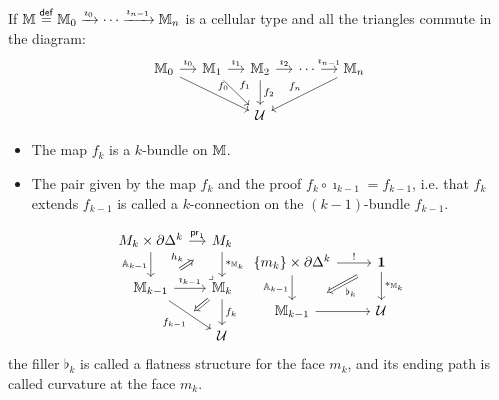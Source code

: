 \documentclass[14pt,aspectratio=169]{beamer}
\renewcommand{\mathrm}[1]{\mathsf{#1}}
\renewcommand{\defemph}[1]{\alert{#1}}
\begin{document}
\begin{frame}
\begin{definition}
If \( \mm\defeq \mm_0\xrightarrow[]{\imath_0}\cdots\xrightarrow[]{\imath_{n-1}}\mm_n \) is a cellular type and all the triangles commute in the diagram:\vspace{-10pt}
\[\begin{tikzcd}[ampersand replacement=\&, column sep=small]
  {\mm_0} \& {\mm_1} \& {\mm_2} \& \cdots \& {\mm_n} \\
\&\& {\mathcal{U}}
\arrow["{\imath_0}", from=1-1, to=1-2]
\arrow["{f_0}", from=1-1, to=2-3]
\arrow["{\imath_1}", from=1-2, to=1-3]
\arrow["{f_1}", from=1-2, to=2-3]
\arrow["{\imath_2}", from=1-3, to=1-4]
\arrow["{f_2}", from=1-3, to=2-3]
\arrow["{\imath_{n-1}}", from=1-4, to=1-5]
\arrow["f_n"', from=1-5, to=2-3]
\end{tikzcd}\]\vspace{-15pt}
\begin{itemize}
\item The map \( f_k \) is a \defemph{\( k \)-bundle} on \( \mathbb{M} \).
\item The pair given by the map \( f_k \) and the proof \( f_k\circ \imath_{k-1}=f_{k-1} \), i.e. that \( f_k \) extends \( f_{k-1} \) is called a \defemph{\( k \)-connection on the \( (k-1) \)-bundle \( f_{k-1} \)}.
\end{itemize}
\end{definition}
\end{frame}

\begin{frame}
\begin{mydef}
\[\begin{tikzcd}[ampersand replacement=\&, column sep=small]
  {M_k\times \partial\Delta^k} \& {M_k} \\
  {\mathbb{M}_{k-1}} \& {\mathbb{M}_k} \\
  \& {\mathcal{U}}
  \arrow["{\mathrm{pr}_1}", from=1-1, to=1-2]
  \arrow["{\mathbb{A}_{k-1}}"', from=1-1, to=2-1]
  \arrow["{*_{\mathbb{M}_k}}", from=1-2, to=2-2]
  \arrow["{h_k}", shorten <=10pt, shorten >=10pt, Rightarrow, from=2-1, to=1-2]
  \arrow["{\imath_{k-1}}", from=2-1, to=2-2]
  \arrow[""{name=0, anchor=center, inner sep=0}, "{f_{k-1}}"', from=2-1, to=3-2]
  \arrow["\ulcorner"{pos=-0.05, rotate=180}, shift left=1.5, draw=none, from=2-2, to=1-1]
  \arrow["{f_k}", from=2-2, to=3-2]
  \arrow[shorten >=3pt, Rightarrow, from=2-2, to=0]
\end{tikzcd}
\begin{tikzcd}[ampersand replacement=\&]
  {\{m_k\}\times \partial\Delta^k} \& \unit \\
  {\mathbb{M}_{k-1}} \& {\mathcal{U}}
  \arrow["{!}", from=1-1, to=1-2]
  \arrow["{\mathbb{A}_{k-1}}"', from=1-1, to=2-1]
  \arrow["{*_{\mathbb{M}_k}}", from=1-2, to=2-2]
  \arrow["{\flat_k}", shorten <=11pt, shorten >=11pt, Rightarrow, from=1-2, to=2-1]
  \arrow[from=2-1, to=2-2]
\end{tikzcd}\]
the filler \( \flat_k \) is called a \defemph{flatness structure for the face \( m_k \)}, and its ending path is called \defemph{curvature at the face \( m_k \)}.
\end{mydef}
\end{frame}
\end{document}
